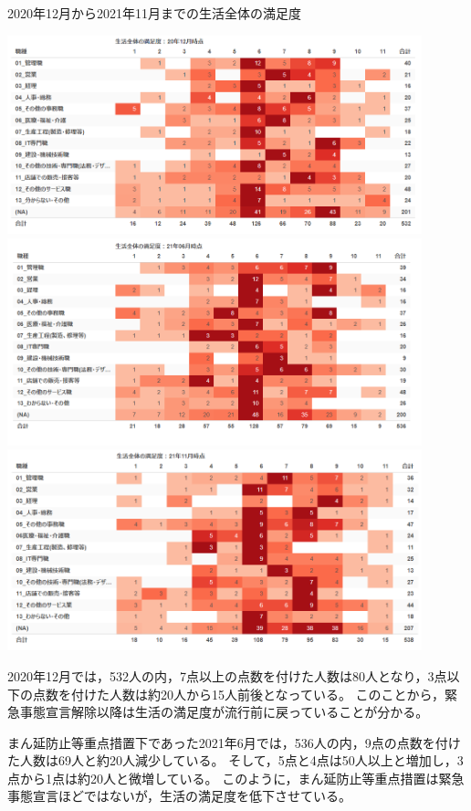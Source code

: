\documentclass[paper={210mm,297mm},fontsize=15Q,line_length=35zw,number_of_lines=31,head_space=30mm,gutter=40mm,baselineskip=2.0zw,headfoot_verticalposition=1.5zw]{jlreq}
\begin{document}
\begin{table}[H]
  \centering
  \caption{2020年12月から2021年11月までの生活全体の満足度} %
  \includegraphics[width=120mm]{../Figure/c05s01_table_全体の生活の満足度：R2-12.png}
  \includegraphics[width=120mm]{../Figure/c05s01_table_全体の生活の満足度：R3-06.png}
  \includegraphics[width=120mm]{../Figure/c05s01_table_全体の生活の満足度：R3-11.png}
  \label{生活全体の満足度_2020年12月から}
\end{table}

2020年12月では，532人の内，7点以上の点数を付けた人数は80人となり，3点以下の点数を付けた人数は約20人から15人前後となっている。
このことから，緊急事態宣言解除以降は生活の満足度が流行前に戻っていることが分かる。

まん延防止等重点措置下であった2021年6月では，536人の内，9点の点数を付けた人数は69人と約20人減少している。
そして，5点と4点は50人以上と増加し，3点から1点は約20人と微増している。
このように，まん延防止等重点措置は緊急事態宣言ほどではないが，生活の満足度を低下させている。
\end{document}
